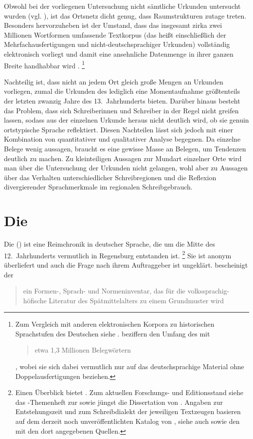 Obwohl bei der vorliegenen Untersuchung nicht sämtliche Urkunden untersucht
wurden (vgl. ), ist das Ortsnetz dicht genug, dass
Raumstrukturen zutage treten. Besonders hervorzuheben ist der Umstand, dass das
insgesamt zirka zwei Millionen Wortformen umfassende Textkorpus (das heißt
einschließlich der Mehrfachausfertigungen und nicht-deutschsprachiger Urkunden)
vollständig elektronisch vorliegt \autocites{gniffkerapp2005}{cao-online} und
damit eine ansehnliche Datenmenge in ihrer ganzen Breite handhabbar wird
\autocite{beckerschallert2021,beckerschallert2022b}.%
%
	\footnote{Zum Vergleich mit anderen elektronischen Korpora zu historischen
	Sprachstufen des Deutschen siehe \citet{dipper2015}.
	\citet[391]{gniffkerapp2005} beziffern den Umfang des \CAO{} mit
	\blockquote{etwa 1,3 Millionen Belegwörtern}, wobei sie sich dabei
	vermutlich nur auf das deutschsprachige Material ohne Doppelausfertigungen
	beziehen.} %

Nachteilig ist, dass nicht an jedem Ort gleich große Mengen an Urkunden
vorliegen, zumal die Urkunden des \CAO{} lediglich eine Momentaufnahme
größtenteils der letzten zwanzig Jahre des 13.~Jahrhunderts bieten. Darüber
hinaus besteht das Problem, dass sich Schreiberinnen und Schreiber in der Regel
nicht greifen lassen, sodass aus der einzelnen Urkunde heraus nicht deutlich
wird, ob sie genuin ortstypische Sprache reflektiert. Diesen Nachteilen lässt
sich jedoch mit einer Kombination von quantitativer und qualitativer Analyse
begegnen. Da einzelne Belege wenig aussagen, braucht es eine gewisse Masse an
Belegen, um Tendenzen deutlich zu machen.
Zu kleinteiligen Aus\-sagen zur Mundart einzelner Orte wird man über die
Untersuchung der Urkunden nicht gelangen, wohl aber zu Aussagen über das
Verhalten unterschiedlicher Schreibregionen und die Reflexion divergierender
Sprachmerkmale im regionalen Schreibgebrauch.


\section{Die }
\label{sec:materialkc}

Die  (\KC{}) ist eine Reimchronik in deutscher Sprache, die
um die Mitte des 12.~Jahrhunderts vermutlich in Regensburg entstanden ist.%
%
	\footnote{Einen Überblick bietet \citet{nellmann1983}. Zum aktuellen
	Forschungs- und Editionsstand siehe das -Themenheft zur \KC{}
	\autocite{wolf2019} sowie jüngst die Dissertation von \citet{weis2022}.
	Angaben zur Entstehungszeit und zum Schreibdialekt der jeweiligen
	Textzeugen basieren auf dem derzeit noch unveröffentlichten Katalog von
	\citet{wolf:kckat}, siehe auch \nocite{kcdigital}
	sowie den \citet[s.\,v.~\textit{}]{hsc} mit den dort
	angegebenen Quellen.}
%
Sie ist anonym überliefert und auch die Frage nach ihrem Auftraggeber ist
ungeklärt. \citet[92]{wolf2008} bescheinigt der \KC{}
\blockquote{ein Formen-, Sprach- und Normeninventar, das für die
volks\-sprachig-höfische Literatur des Spätmittelalters zu einem Grundmuster
wird}.

